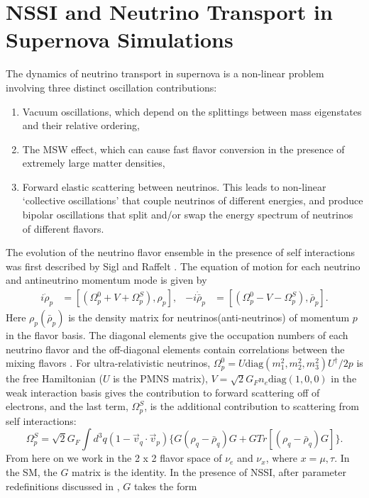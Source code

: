 \documentclass[a4paper,12pt]{article}
\begin{document}
\section{NSSI and Neutrino Transport in Supernova Simulations}
The dynamics of neutrino transport in supernova is a non-linear problem involving three distinct oscillation contributions:
\begin{enumerate}
\item Vacuum oscillations, which depend on the splittings between mass eigenstates and their relative ordering,
\item The MSW effect, which can cause fast flavor conversion in the presence of extremely large matter densities,
\item Forward elastic scattering between neutrinos. This leads to non-linear `collective oscillations' that couple neutrinos of different energies, and produce bipolar oscillations that split and/or swap the energy spectrum of neutrinos of different flavors.
\end{enumerate}
The evolution of the neutrino flavor ensemble in the presence of self interactions was first described by Sigl and Raffelt \cite{Sigl:1992fn}. The equation of motion for each neutrino and antineutrino momentum mode is given by
\begin{align}
i\dot{\rho}_{p} &= [(\Omega^{0}_{p} + V + \Omega^{S}_{p}), \rho_{p}], & -i\dot{\bar{\rho}}_{p} &= [(\Omega^{0}_{p} - V - \Omega^{S}_{p}), \bar{\rho}_{p}].
\end{align}
Here $\rho_{p}(\bar{\rho}_{p})$ is the density matrix for neutrinos(anti-neutrinos) of momentum $p$ in the flavor basis. The diagonal elements give the occupation numbers of each neutrino flavor and the off-diagonal elements contain correlations between the mixing flavors \cite{Sigl:1992fn}. For ultra-relativistic neutrinos, $\Omega^{0}_{p} = U\text{diag}(m^{2}_{1}, m^{2}_{2}, m^{2}_{3})U^{\dagger}/2p$ is the free Hamiltonian ($U$ is the PMNS matrix),  $V = \sqrt{2}G_{F}n_{e}\text{diag}(1,0,0)$ in the weak interaction basis gives the contribution to forward scattering off of electrons, and the last term, $\Omega^{S}_{p}$, is the additional contribution to scattering from self interactions:
\begin{equation}
\Omega^{S}_{p} = \sqrt{2}G_{F}\int d^{3}q (1 - \vec{v}_{q} \cdot \vec{v}_{p})\{G(\rho_{q} - \bar{\rho}_{q})G + GTr[(\rho_{q} - \bar{\rho}_{q})G]\}.
\end{equation}
From here on we work in the 2 x 2 flavor space of $\nu_{e}$ and $\nu_{x}$, where $x = \mu, \tau$. In the SM, the $G$ matrix is the identity. In the presence of NSSI, after parameter redefinitions discussed in \cite{Dighe:2017sur}, $G$ takes the form
\end{document}
